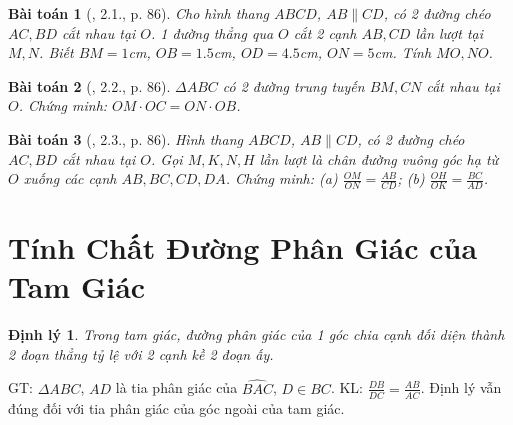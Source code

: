 \documentclass{article}
\newtheorem{baitoan}{Bài toán}
\newtheorem{dinhly}{Định lý}
\begin{document}
\begin{baitoan}[\cite{SBT_Toan_8_tap_2}, 2.1., p. 86]
	Cho hình thang $ABCD$, $AB\parallel CD$, có 2 đường chéo $AC,BD$ cắt nhau tại $O$. 1 đường thẳng qua $O$ cắt 2 cạnh $AB,CD$ lần lượt tại $M,N$. Biết $BM = 1$\emph{cm}, $OB = 1.5$\emph{cm}, $OD = 4.5$\emph{cm}, $ON = 5$\emph{cm}. Tính $MO,NO$.
\end{baitoan}

\begin{baitoan}[\cite{SBT_Toan_8_tap_2}, 2.2., p. 86]
	$\Delta ABC$ có 2 đường trung tuyến $BM,CN$ cắt nhau tại $O$. Chứng minh: $OM\cdot OC = ON\cdot OB$.
\end{baitoan}

\begin{baitoan}[\cite{SBT_Toan_8_tap_2}, 2.3., p. 86]
	Hình thang $ABCD$, $AB\parallel CD$, có 2 đường chéo $AC,BD$ cắt nhau tại $O$. Gọi $M,K,N,H$ lần lượt là chân đường vuông góc hạ từ $O$ xuống các cạnh $AB,BC,CD,DA$. Chứng minh: (a) $\frac{OM}{ON} = \frac{AB}{CD}$; (b) $\frac{OH}{OK} = \frac{BC}{AD}$.
\end{baitoan}


\section{Tính Chất Đường Phân Giác của Tam Giác}

\begin{dinhly}
	Trong tam giác, đường phân giác của 1 góc chia cạnh đối diện thành 2 đoạn thẳng tỷ lệ với 2 cạnh kề 2 đoạn ấy.
\end{dinhly}
GT: $\Delta ABC$, $AD$ là tia phân giác của $\widehat{BAC}$, $D\in BC$. KL: $\frac{DB}{DC} = \frac{AB}{AC}$. Định lý vẫn đúng đối với tia phân giác của  góc ngoài của tam giác.
\end{document}

